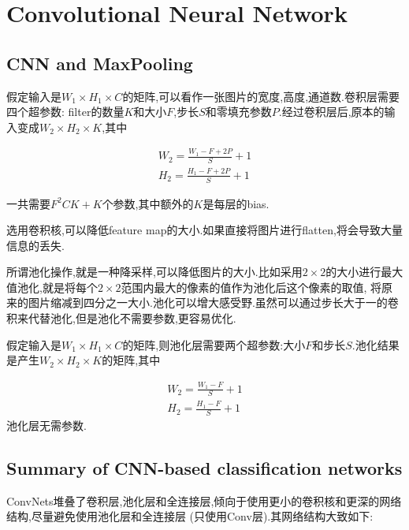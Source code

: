 \chapter{Convolutional Neural Network}

\section{CNN and MaxPooling}

假定输入是$W_1 \times H_1 \times C$的矩阵,可以看作一张图片的宽度,高度,通道数.卷积层需要四个超参数:
filter的数量$K$和大小$F$,步长$S$和零填充参数$P$.经过卷积层后,原本的输入变成$W_2 \times H_2 \times K$,其中

\begin{equation}
	\begin{split}
		W_2 = \frac{W_1 - F + 2P}{S} + 1
		\\
		H_2 = \frac{H_1 - F + 2P}{S} + 1
	\end{split}
\end{equation}

一共需要$F^2CK+K$个参数,其中额外的$K$是每层的bias.

选用卷积核,可以降低feature map的大小.如果直接将图片进行flatten,将会导致大量信息的丢失.

所谓池化操作,就是一种降采样,可以降低图片的大小.比如采用$2\times 2$的大小进行最大值池化,就是将每个$2\times 2$范围内最大的像素的值作为池化后这个像素的取值,
将原来的图片缩减到四分之一大小.池化可以增大感受野.虽然可以通过步长大于一的卷积来代替池化,但是池化不需要参数,更容易优化.

假定输入是$W_1 \times H_1 \times C$的矩阵,则池化层需要两个超参数:大小$F$和步长$S$.池化结果是产生$W_2 \times H_2 \times K$的矩阵,其中

\begin{equation}
	\begin{split}
		W_2 = \frac{W_1 - F}{S} + 1
		\\
		H_2 = \frac{H_1 - F}{S} + 1
	\end{split}
\end{equation}
池化层无需参数.

\section{Summary of CNN-based classification networks}

ConvNets堆叠了卷积层,池化层和全连接层,倾向于使用更小的卷积核和更深的网络结构,尽量避免使用池化层和全连接层 (只使用Conv层).其网络结构大致如下:


